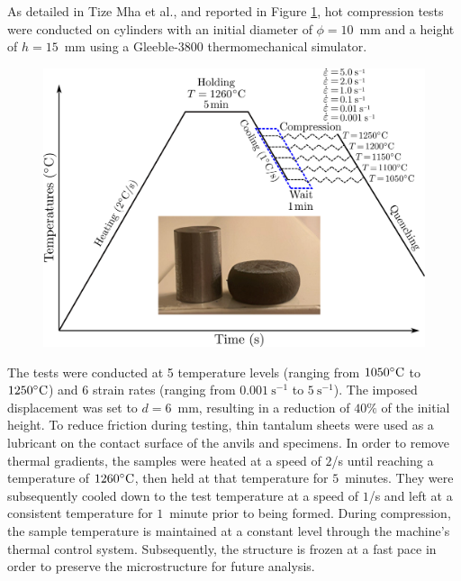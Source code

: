 \documentclass[metals,article,submit,pdftex,moreauthors]{Definitions/mdpi}
\makeatletter
\DeclareRobustCommand{\eal}{et al.\@\xspace}
\DeclareRobustCommand{\ps}{\text{s}^{-1}}
\makeatother
\begin{document}
As detailed in Tize Mha \eal \cite{TizeMha-2023}, and reported in Figure \ref{fig:GleebleProcess}, hot compression tests were conducted on cylinders with an initial diameter of $\phi=10$~mm and a height of $h=15$~mm using a Gleeble-3800 thermomechanical simulator.
\begin{figure}[H]
\centering
\includegraphics[width=0.7\columnwidth]{Figures/GleebleProcess}
\caption{}
\label{fig:GleebleProcess}
\end{figure}
The tests were conducted at 5 temperature levels (ranging from $1050\celsius$ to $1250\celsius$) and 6 strain rates (ranging from $0.001~\ps$ to $5~\ps$).
The imposed displacement was set to $d=6$~mm, resulting in a reduction of $40\%$ of the initial height.
To reduce friction during testing, thin tantalum sheets were used as a lubricant on the contact surface of the anvils and specimens.
In order to remove thermal gradients, the samples were heated at a speed of $2$\celsius/s until reaching a temperature of $1260\celsius$, then held at that temperature for $5$~minutes.
They were subsequently cooled down to the test temperature at a speed of $1$\celsius/s and left at a consistent temperature for $1$~minute prior to being formed.
During compression, the sample temperature is maintained at a constant level through the machine's thermal control system.
Subsequently, the structure is frozen at a fast pace in order to preserve the microstructure for future analysis.
\end{document}
